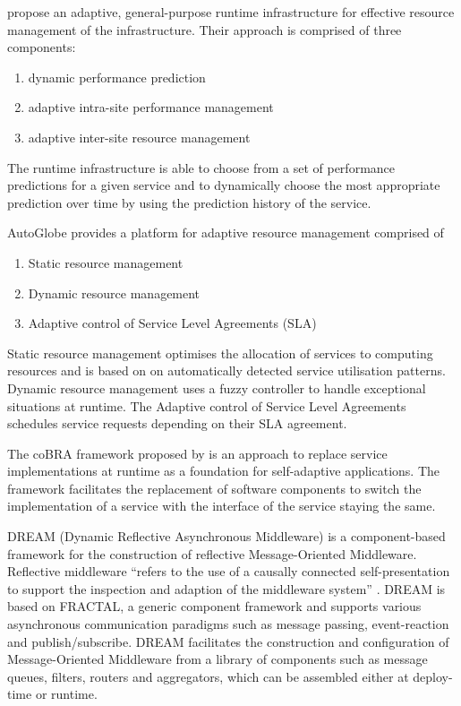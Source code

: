 \citet{Lee:2009vn} propose an adaptive, general-purpose runtime infrastructure for effective resource management of the infrastructure. Their approach is comprised of three components:
\begin{enumerate}
	\item dynamic performance prediction
	\item adaptive intra-site performance management
	\item adaptive inter-site resource management
\end{enumerate}

The runtime infrastructure is able to choose from a set of performance predictions for a given service and to dynamically choose the most appropriate prediction over time by using the prediction history of the service.

AutoGlobe \citep{Gmach:2008vo} provides a platform for adaptive resource management comprised of 
\begin{enumerate}
	\item Static resource management
	\item Dynamic resource management
	\item Adaptive control of Service Level Agreements (SLA)
\end{enumerate}
Static resource management optimises the allocation of services to computing resources and is based on on automatically detected service utilisation patterns. Dynamic resource management uses a fuzzy controller to handle exceptional situations at runtime. The Adaptive control of Service Level Agreements schedules service requests depending on their SLA agreement.

The coBRA framework proposed by \citet{Irmert:2008nx} is an approach to replace service implementations at runtime as a foundation for self-adaptive applications. The framework facilitates the replacement of software components to switch the implementation of a service with the interface of the service staying the same.

DREAM (Dynamic Reflective Asynchronous Middleware) \citep{Leclercq:2004ly} is a component-based framework for the construction of reflective Message-Oriented Middleware. Reflective middleware ``refers to the use of a causally connected self-presentation to support the inspection and adaption of the middleware system'' \citep{Kon:2002fu}. DREAM is based on FRACTAL, a generic component framework and supports various asynchronous communication paradigms such as message passing, event-reaction and publish/subscribe. DREAM facilitates the construction and configuration of Message-Oriented Middleware from a library of components such as message queues, filters, routers and aggregators, which can be assembled either at deploy-time or runtime.
